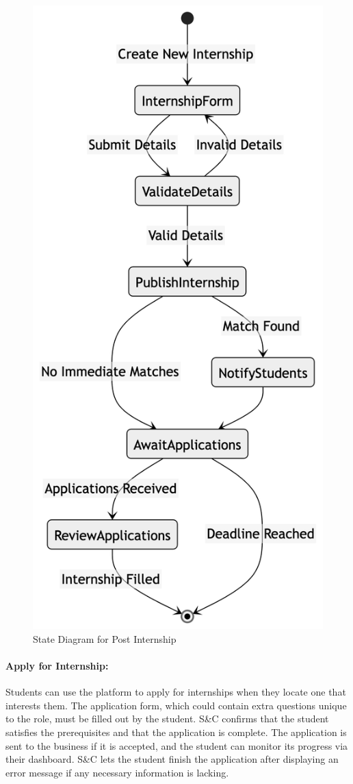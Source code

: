 \begin{figure}[H]
    \begin{center}
        \includegraphics[width=0.35\linewidth]{JhaBhatiaSharma/Images/State Diagrams/PostInternship.png}
        \caption{State Diagram for Post Internship}
        \label{fig:postInternship}%
    \end{center}
\end{figure}

\paragraph{Apply for Internship:}
Students can use the platform to apply for internships when they locate one that interests them. The application form, which could contain extra questions unique to the role, must be filled out by the student. S\&C confirms that the student satisfies the prerequisites and that the application is complete. The application is sent to the business if it is accepted, and the student can monitor its progress via their dashboard. S\&C lets the student finish the application after displaying an error message if any necessary information is lacking.


